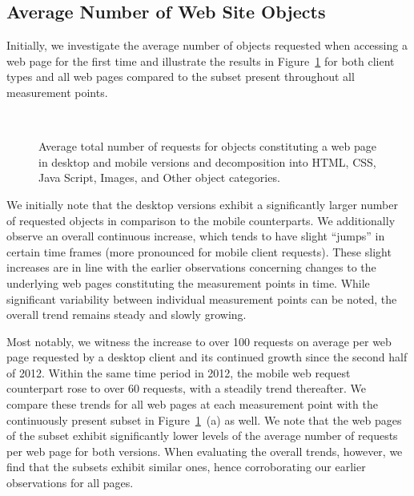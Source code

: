\subsection*{Average Number of Web Site Objects}
\label{ss:objects}
Initially, we investigate the average number of objects requested when accessing a web page for the first time and illustrate the results in Figure~\ref{fig:requests} for both client types and all web pages compared to the subset present throughout all measurement points.

\begin{figure}
\centering
	\\ 
	\qquad
	\qquad
\caption{Average total number of requests for objects constituting a web page in desktop and mobile versions and decomposition into  HTML, CSS, Java Script, Images, and Other object categories.\label{fig:requests}}
\end{figure}

We initially note that the desktop versions exhibit a significantly larger number of requested objects in comparison to the mobile counterparts.
We additionally observe an overall continuous increase, which tends to have slight ``jumps'' in certain time frames (more pronounced for mobile client requests). 
These slight increases are in line with the earlier observations concerning changes to the underlying web pages constituting the measurement points in time. While significant variability between individual measurement points can be noted,  the overall trend remains steady and slowly growing.


Most notably, we witness the increase to over 100 requests on average per web page requested by a desktop client and its continued growth since the second half of 2012.
Within the same time period in 2012, the mobile web request counterpart rose to over 60 requests, with a steadily trend thereafter. 
We compare these trends for all web pages at each measurement point with the continuously present subset in Figure~\ref{fig:requests}~(a) as well.
We note that the web pages of the subset exhibit significantly lower levels of the average number of requests per web page for both versions. 
When evaluating the overall trends, however, we find that the subsets exhibit similar ones, hence corroborating our earlier observations for all pages.

